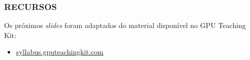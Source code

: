 \documentclass[10pt, compress]{beamer}
\begin{document}
\begin{frame}
    \frametitle{RECURSOS}
    
    Os próximos \emph{slides} foram adaptados do
    material disponível no \alert{GPU Teaching Kit}:
    \begin{itemize}
        \item \url{syllabus.gputeachingkit.com}
    \end{itemize}

\end{frame}


\maketitle
\end{document}
